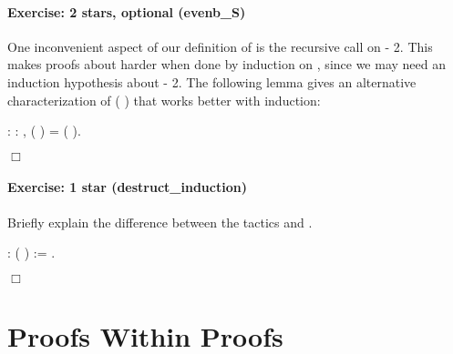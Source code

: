 \documentclass[12pt]{report}
\begin{document}
\paragraph{Exercise: 2 stars, optional (evenb\_S)}

 One inconvenient aspect of our definition of   is the
    recursive call on  - 2. This makes proofs about  
    harder when done by induction on , since we may need an
    induction hypothesis about  - 2. The following lemma gives an
    alternative characterization of  ( ) that works better
    with induction: \begin{coqdoccode}
\coqdocemptyline
\coqdocnoindent
{}  : \coqdockw{\ensuremath{\forall}}  : ,\coqdoceol
\coqdocindent{1.00em}
 ( ) =  ( ).\coqdoceol
 \end{coqdoccode}
\ensuremath{\Box} 

\paragraph{Exercise: 1 star (destruct\_induction)}

 Briefly explain the difference between the tactics 
    and .


\begin{coqdoccode}
\coqdocemptyline
\coqdocnoindent
{}  :  (  ) := .\coqdoceol
\end{coqdoccode}
\ensuremath{\Box} \begin{coqdoccode}
\coqdocemptyline
\end{coqdoccode}
\section{Proofs Within Proofs}
\end{document}
